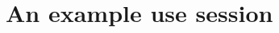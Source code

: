 \documentclass{article}
\begin{document}

\section{An example use session} \label{sec:illustration}
\end{document}
